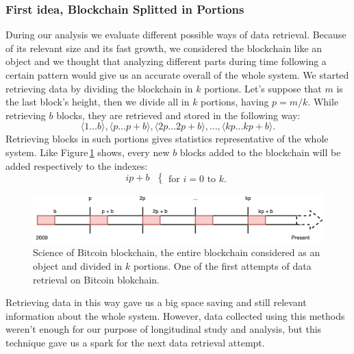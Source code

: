 \documentclass[USenglish]{uit-thesis}
\begin{document}
\subsubsection{First idea, Blockchain Splitted in Portions}
During our analysis we evaluate different possible ways
of data retrieval. Because of its relevant size
and its fast growth, we considered the blockchain like
an object and we thought that analyzing different
parts during time following a certain pattern would
give us an accurate overall of the whole system. We
started retrieving data by dividing the blockchain in
$k$ portions.
Let's suppose that $m$ is the last
block's height, then we divide
all in $k$ portions, having $p = m / k$.
While retrieving $b$ blocks, they are
retrieved and stored in the following way:
\[\langle 1 \dots b\rangle, \langle p \dots p+b\rangle, \langle 2p \dots 2p + b \rangle, \dots , \langle kp \dots kp+b\rangle.\]
Retrieving blocks in such portions gives
statistics representative of the whole system.
Like Figure\,\ref{fig:portions} shows,
every new $b$ blocks added to the
blockchain will be added respectively to the indexes:
\begin{equation}
ip + b\textrm{ }
\begin{cases}
\textrm{for } i = 0 \textrm{ to } k.
\end{cases}
\end{equation}
\begin{figure}[h]
	\centering
	\includegraphics[width=1\textwidth]{img/portions}
	\caption{Science of Bitcoin blockchain, the entire blockchain considered as
		an object and divided in $k$ portions. One of the first attempts of data
	retrieval on Bitcoin blokchain.}
	\label{fig:portions}
\end{figure}
Retrieving data in this way gave us a big space saving and still
relevant information about the whole system. However, data
collected using this methods weren't enough for our purpose
of longitudinal study and analysis, but this technique gave us
a spark for the next data retrieval attempt.
\end{document}

